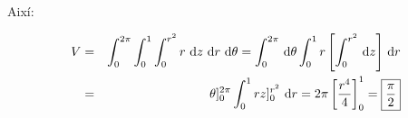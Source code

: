 Així:

\begin{eqnarray*}
  V&=&\int_{0}^{2\pi}  \int_{0}^{1} \int_0^{r^2} r \, \mathop{}\!\mathrm{d} z \, \mathop{}\!\mathrm{d} r \, \mathop{}\!\mathrm{d} \theta = \int_{0}^{2\pi} \, \mathop{}\!\mathrm{d} \theta  \int_{0}^{1} r \left[\int_0^{r^2} \, \mathop{}\!\mathrm{d} z\right] \, \mathop{}\!\mathrm{d} r \\
  &=& \theta]_{0}^{2\pi} \int_{0}^{1} r z]_0^{r^2} \, \mathop{}\!\mathrm{d} r = 2\pi \left[\frac{r^4}{4}\right]_0^1=\boxed{\frac{\pi}{2}}
\end{eqnarray*}

